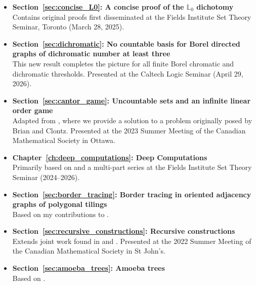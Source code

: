 
\begin{publications}
\begin{itemize}
    \item \textbf{Section~\ref{sec:concise_L0}: A concise proof of the $\mathbb{L}_0$ dichotomy}\\
    Contains original proofs first disseminated at the Fields Institute Set Theory Seminar, Toronto (March 28, 2025).

    \item \textbf{Section~\ref{sec:dichromatic}: No countable basis for Borel directed graphs of dichromatic number at least three}\\
    This new result completes the picture for all finite Borel chromatic and dichromatic thresholds.
    Presented at the Caltech Logic Seminar (April 29, 2026).

    \item \textbf{Section~\ref{sec:cantor_game}: Uncountable sets and an infinite linear order game}\\
    Adapted from \cite{MatosWiederholdSalvetti2025}, where we provide a solution to a problem originally posed by Brian and Clontz.
    Presented at the 2023 Summer Meeting of the Canadian Mathematical Society in Ottawa.

    \item \textbf{Chapter~\ref{ch:deep_computations}: Deep Computations}\\
    Primarily based on \cite{Duenezetal2026} and a multi-part series at the Fields Institute Set Theory Seminar (2024--2026).

    \item \textbf{Section~\ref{sec:border_tracing}: Border tracing in oriented adjacency graphs of polygonal tilings}\\
    Based on my contributions to \cite{WiederholdMatosWiederhold2026}.

    \item \textbf{Section~\ref{sec:recursive_constructions}: Recursive constructions}\\
    Extends joint work found in \cite{Eslavaetal2025} and \cite{Caroetal2023}.
    Presented at the 2022 Summer Meeting of the Canadian Mathematical Society in St John's.

    \item \textbf{Section~\ref{sec:amoeba_trees}: Amoeba trees}\\
    Based on \cite{GomezetalPreprint}.
\end{itemize}
\end{publications}